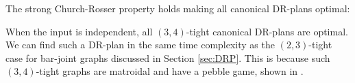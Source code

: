 


The strong Church-Rosser property holds making all canonical DR-plans
optimal:
%
\begin{remark}\label{rem:1dofcanon}
    When the input is independent,
    all $(3,4)$-tight canonical DR-plans are optimal. We can find such a
    DR-plan in the same time complexity as the $(2,3)$-tight case for bar-joint graphs discussed in Section \ref{sec:DRP}.
    This is because
    such $(3,4)$-tight graphs are matroidal and have a pebble game, shown in \cite{Lee:2007:PGA}.
\end{remark}

